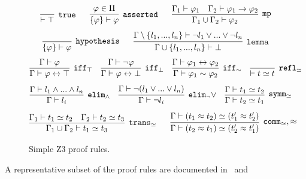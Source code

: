 \documentclass{article}
\begin{document}
		\begin{figure}[t]
			\begin{equation*}
				\infer[\texttt{true}]
					{\vdash \top}
					{}
				\ \ \ \ \ 
				\infer[\texttt{asserted}]
					{\{\varphi\} \vdash \varphi}
					{\varphi \in \Pi}
				\ \ \ \ \ 
				\infer[\texttt{mp}]
					{\Gamma_1 \cup \Gamma_2 \vdash \varphi_2}
					{\Gamma_1 \vdash \varphi_1 & 
					\Gamma_2 \vdash \varphi_1 \to \varphi_2}
			\end{equation*}
			\begin{equation*}
				\infer[\texttt{hypothesis}]
				{\{\varphi\} \vdash \varphi}
				{}
				\ \ \ \ \ 
				\infer[\texttt{lemma}]
					{\Gamma \cup \{l_1,...,l_n\} \vdash \bot}
					{\Gamma \setminus \{l_1,...,l_n\} 
						\vdash \neg l_1 \lor ... \lor \neg l_n}
			\end{equation*}
			\begin{equation*}
				\infer[\texttt{iff$_\top$}]
					{\Gamma \vdash \varphi \leftrightarrow \top}
					{\Gamma \vdash \varphi}
				\ \ \ 
				\infer[\texttt{iff$_\bot$}]
					{\Gamma \vdash \varphi \leftrightarrow \bot}
					{\Gamma \vdash \neg \varphi}
				\ \ \ 
				\infer[\texttt{iff$_\sim$}]
					{\Gamma \vdash \varphi_1 \sim \varphi_2}
					{\Gamma \vdash \varphi_1 \leftrightarrow \varphi_2}
				\ \ \ 
				\infer[\texttt{refl$_\simeq$}]
					{\vdash t \simeq t}
					{}
			\end{equation*}
			\begin{equation*}
			\infer[\texttt{elim$_\land$}]
				{\Gamma \vdash l_i}
				{\Gamma \vdash l_1 \land ... \land l_n}
			\ \ \ 
			\infer[\texttt{elim$_\neg\lor$}]
				{\Gamma \vdash \neg l_i}
				{\Gamma \vdash \neg (l_1 \lor ... \lor l_n)}
			\ \ \ 
			\infer[\texttt{symm$_\simeq$}]
				{\Gamma \vdash t_2 \simeq t_1}
				{\Gamma \vdash t_1 \simeq t_2}
			\end{equation*}
			\begin{equation*}
				\infer[\texttt{trans$_\simeq$}]
					{\Gamma_1 \cup \Gamma_2 \vdash t_1 \simeq t_3}
					{\Gamma_1 \vdash t_1 \simeq t_2 & 
				 	\Gamma_2 \vdash t_2 \simeq t_3}
			 	\ \ \ \ \ 
			 	\infer[\texttt{comm$_\simeq,\approx$}]
			 		{\Gamma \vdash (t_2 \approx t_1) \simeq (t_2^{\prime} \approx t_1^{\prime})}
			 		{\Gamma \vdash (t_1 \approx t_2) \simeq (t_1^{\prime} \approx t_2^{\prime})}
			\end{equation*}
			\caption{Simple Z3 proof rules.}
			\label{fig:z3-rules}
		\end{figure}
		A representative subset of the proof rules are 
		documented in~\cite{DBLP:phd/dnb/Bohme12} and 
\end{document}
